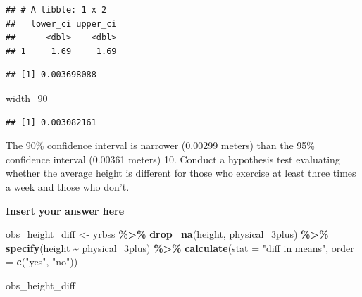 \documentclass[
]{article}
\newenvironment{Shaded}{\begin{snugshade}}{\end{snugshade}}
\newcommand{\AttributeTok}[1]{\textcolor[rgb]{0.13,0.29,0.53}{#1}}
\newcommand{\FunctionTok}[1]{\textcolor[rgb]{0.13,0.29,0.53}{\textbf{#1}}}
\newcommand{\NormalTok}[1]{#1}
\newcommand{\OtherTok}[1]{\textcolor[rgb]{0.56,0.35,0.01}{#1}}
\newcommand{\SpecialCharTok}[1]{\textcolor[rgb]{0.81,0.36,0.00}{\textbf{#1}}}
\newcommand{\StringTok}[1]{\textcolor[rgb]{0.31,0.60,0.02}{#1}}
\begin{document}
\begin{verbatim}
## # A tibble: 1 x 2
##   lower_ci upper_ci
##      <dbl>    <dbl>
## 1     1.69     1.69
\end{verbatim}

\begin{Shaded}
\end{Shaded}

\begin{verbatim}
## [1] 0.003698088
\end{verbatim}

\begin{Shaded}
\begin{Highlighting}[]
\NormalTok{width\_90}
\end{Highlighting}
\end{Shaded}

\begin{verbatim}
## [1] 0.003082161
\end{verbatim}

The 90\% confidence interval is narrower (0.00299 meters) than the 95\%
confidence interval (0.00361 meters) 10. Conduct a hypothesis test
evaluating whether the average height is different for those who
exercise at least three times a week and those who don't.

\textbf{Insert your answer here}

\begin{Shaded}
\begin{Highlighting}[]
\NormalTok{obs\_height\_diff }\OtherTok{\textless{}{-}}\NormalTok{ yrbss }\SpecialCharTok{\%\textgreater{}\%}
  \FunctionTok{drop\_na}\NormalTok{(height, physical\_3plus) }\SpecialCharTok{\%\textgreater{}\%}
  \FunctionTok{specify}\NormalTok{(height }\SpecialCharTok{\textasciitilde{}}\NormalTok{ physical\_3plus) }\SpecialCharTok{\%\textgreater{}\%}
  \FunctionTok{calculate}\NormalTok{(}\AttributeTok{stat =} \StringTok{"diff in means"}\NormalTok{, }\AttributeTok{order =} \FunctionTok{c}\NormalTok{(}\StringTok{"yes"}\NormalTok{, }\StringTok{"no"}\NormalTok{))}

\NormalTok{obs\_height\_diff}
\end{Highlighting}
\end{Shaded}
\end{document}
